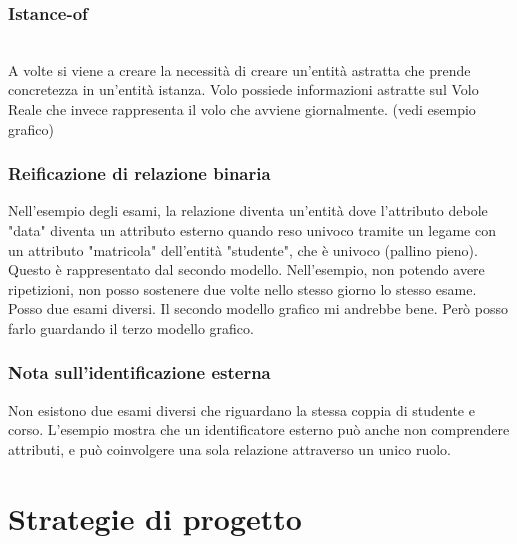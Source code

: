 \subsubsection{Istance-of}
\\A volte si viene a creare la necessità di creare un'entità astratta che prende concretezza in un'entità istanza. Volo possiede informazioni astratte sul Volo Reale che invece rappresenta il volo che avviene giornalmente. (vedi esempio grafico)

\subsubsection{Reificazione di relazione binaria}
Nell'esempio degli esami, la relazione diventa un'entità dove l'attributo debole "data" diventa un attributo esterno quando reso univoco tramite un legame con un attributo "matricola" dell'entità "studente", che è univoco (pallino pieno). Questo è rappresentato dal secondo modello. Nell'esempio, non potendo avere ripetizioni, non posso sostenere due volte nello stesso giorno lo stesso esame. Posso due esami diversi. Il secondo modello grafico mi andrebbe bene. Però posso farlo guardando il terzo modello grafico.

\subsubsection{Nota sull'identificazione esterna}
Non esistono due esami diversi che riguardano la stessa coppia di studente e corso.
L'esempio mostra che un identificatore esterno può anche non comprendere attributi, e può coinvolgere una sola relazione attraverso un unico ruolo.

\section{Strategie di progetto}